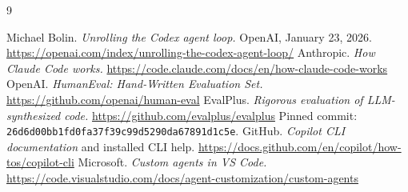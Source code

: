\documentclass[10pt,twocolumn,a4paper]{article}
\begin{document}
\begin{thebibliography}{9}
\small
\raggedright
{}
Michael Bolin. \emph{Unrolling the Codex agent loop.}
OpenAI, January 23, 2026.
\url{https://openai.com/index/unrolling-the-codex-agent-loop/}
Anthropic. \emph{How Claude Code works.}
\url{https://code.claude.com/docs/en/how-claude-code-works}
OpenAI. \emph{HumanEval: Hand-Written Evaluation Set.}
\url{https://github.com/openai/human-eval}
EvalPlus. \emph{Rigorous evaluation of LLM-synthesized code.}
\url{https://github.com/evalplus/evalplus}
Pinned commit: \texttt{26d6d00bb1fd0fa37f39c99d5290da67891d1c5e}.
GitHub. \emph{Copilot CLI documentation} and installed CLI help.
\url{https://docs.github.com/en/copilot/how-tos/copilot-cli}
Microsoft. \emph{Custom agents in VS Code.}
\url{https://code.visualstudio.com/docs/agent-customization/custom-agents}
\end{thebibliography}
\end{document}
